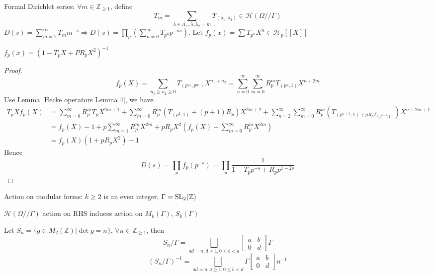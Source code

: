\documentclass[main]{subfiles}
\begin{document}
Formal Dirichlet series: $\forall m\in\mathbb Z_{\geq1}$, define
\[T_m=\sum_{\lambda\in\Lambda_+,\lambda_1\lambda_2=m} T_{(\lambda_1,\lambda_2)}\in\mathscr H(\Omega//\Gamma)\]
$D(s)=\sum_{m=1}^\infty T_mm^{-s}\Rightarrow D(s)=\prod_p(\sum_{n=0}^\infty T_{p^n}p^{-ns})$. Let $f_p(x)=\sum T_{p^n}X^n\in\mathscr H_p[[X]]$

\begin{proposition}
$f_p(x)=(1-T_pX+PR_pX^2)^{-1}$
\end{proposition}

\begin{proof}
\[f_p(X)=\sum_{n_1\geq n_2\geq0}T_{(p^{n_1},p^{n_2})}X^{n_1+n_2}=\sum_{n=0}^\infty\sum_{m=0}^\infty R^m_pT_{(p^n,1)}X^{n+2m}\]
Use Lemma \ref{Hecke operators Lemma 4}, we have
\begin{align*}
T_pXf_p(X)&=\sum_{m=0}^\infty R_p^mT_pX^{2m+1}+\sum_{m=0}^\infty R_p^m(T_{(p^2,1)}+(p+1)R_p)X^{2m+2}+\sum_{n=2}^\infty\sum_{m=0}^\infty R_p^m\left(T_{(p^{n+1},1)+pR_pT_{(p^{n-1},1)}}\right)X^{n+2m+1} \\
&=f_p(X)-1+p\sum_{m=1}^\infty R_p^mX^{2m}+pR_pX^2\left(f_p(X)-\sum_{m=0}^\infty R_p^mX^{2m}\right) \\
&=f_p(X)(1+pR_pX^2)-1
\end{align*}
Hence
\[D(s)=\prod_p f_p(p^{-s})=\prod_p\frac{1}{1-T_pp^{-s}+R_pp^{1-2s}}\]

\end{proof}

Action on modular forms: $k\geq2$ is an even integer, $\Gamma=\operatorname{SL}_2(\mathbb Z)$
\begin{center}
\end{center}
$\mathcal H(\Omega//\Gamma)$ action on RHS induces action on $M_k(\Gamma)$, $S_k(\Gamma)$

\begin{proposition}
Let $S_n=\{g\in M_2(\mathbb Z)|\det g=n\}$, $\forall n\in\mathbb Z_{\geq1}$, then
\[S_n/\Gamma=\bigsqcup_{ad=n,d\geq1,0\leq b<a}\begin{bmatrix}
a&b\\
0&d
\end{bmatrix}\Gamma\]
\[(S_n/\Gamma)^{-1}=\bigsqcup_{ad=n,a\geq1,0\leq b<d}\Gamma\begin{bmatrix}
a&b\\
0&d
\end{bmatrix}n^{-1}\]
\end{proposition}
\end{document}
